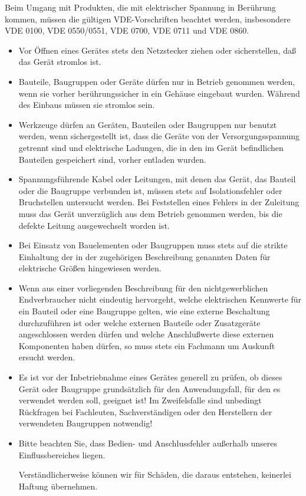 \documentclass[fleqn,10pt]{SelfArx} %
\begin{document}
Beim Umgang mit Produkten, die mit elektrischer Spannung in Berührung kommen, müssen die gültigen VDE-Vorschriften beachtet werden, insbesondere VDE 0100, VDE 0550/0551, VDE 0700, VDE 0711 und VDE 0860.
\begin{itemize}[noitemsep] %
\item Vor Öffnen eines Gerätes stets den Netzstecker ziehen oder sicherstellen, daß das Gerät stromlos ist.
\item Bauteile, Baugruppen oder Geräte dürfen nur in Betrieb genommen werden, wenn sie vorher berührungssicher in ein Gehäuse eingebaut wurden. Während des Einbaus müssen sie stromlos sein.
\item Werkzeuge dürfen an Geräten, Bauteilen oder Baugruppen nur benutzt werden, wenn sichergestellt ist, dass die Geräte von der Versorgungsspannung getrennt sind und elektrische Ladungen, die in den im Gerät befindlichen Bauteilen gespeichert sind, vorher entladen wurden.
\item Spannungsführende Kabel oder Leitungen, mit denen das Gerät, das Bauteil oder die Baugruppe verbunden ist, müssen stets auf Isolationsfehler oder Bruchstellen untersucht werden. Bei Feststellen eines Fehlers in der Zuleitung muss das Gerät unverzüglich aus dem Betrieb genommen werden, bis die defekte Leitung ausgewechselt worden ist.
\item Bei Einsatz von Bauelementen oder Baugruppen muss stets auf die strikte Einhaltung der in der zugehörigen Beschreibung genannten Daten für elektrische Größen hingewiesen werden.
\item Wenn aus einer vorliegenden Beschreibung für den nichtgewerblichen Endverbraucher nicht eindeutig hervorgeht, welche elektrischen Kennwerte für ein Bauteil oder eine Baugruppe gelten, wie eine externe Beschaltung durchzuführen ist oder welche externen Bauteile oder Zusatzgeräte angeschlossen werden dürfen und welche Anschlußwerte diese externen Komponenten haben dürfen, so muss stets ein Fachmann um Auskunft ersucht werden.
\item Es ist vor der Inbetriebnahme eines Gerätes generell zu prüfen, ob dieses Gerät oder Baugruppe grundsätzlich für den Anwendungsfall, für den es verwendet werden soll, geeignet ist! Im Zweifelsfalle sind unbedingt Rückfragen bei Fachleuten, Sachverständigen oder den Herstellern der verwendeten Baugruppen notwendig!
\item Bitte beachten Sie, dass Bedien- und Anschlussfehler außerhalb unseres Einflussbereiches liegen. \par Verständlicherweise können wir für Schäden, die daraus entstehen, keinerlei Haftung übernehmen.

\end{itemize}
\end{document}
